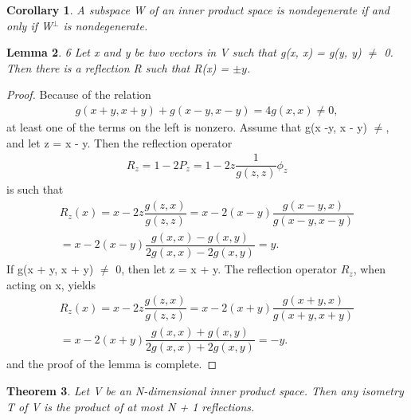 \documentclass[12pt,a4paper]{article}
\newtheorem{thm}{Theorem}
\newtheorem{lem}[thm]{Lemma}
\newtheorem{cor}[thm]{Corollary}
\begin{document}
\begin{cor}
A subspace W of an inner product space is nondegenerate if and only if W$^\perp$ is nondegenerate.
\end{cor}
\begin{lem}
6 Let x and y be two vectors in V such that g(x, x) =
g(y, y) $\ne$ 0. Then there is a reflection R such that R(x) = $\pm y$.
\end{lem}
\begin{proof}
Because of the relation
\begin{eqnarray*}
g(x + y, x + y) + g(x -y, x - y) = 4g(x, x) \ne 0,
\end{eqnarray*}
at least one of the terms on the left is nonzero. Assume that g(x -y, x - y) $\ne$, and let z = x - y. Then the reflection operator
\begin{eqnarray*}
R_z = 1 - 2P_z = 1 - 2z \dfrac{1}{g(z, z)} \phi_z
\end{eqnarray*}
is such that 
\begin{eqnarray*}
R_z(x) = x - 2z\dfrac{g(z,x)}{g(z,z)} = x - 2(x-y)\dfrac{g(x - y, x)}{g(x - y, x -y)}\\
=x - 2(x-y)\dfrac{g(x,x) - g(x, y)}{2g(x,x) - 2g(x,y)} = y.
\end{eqnarray*}
If g(x + y, x + y) $\neq$ 0, then let z = x + y. The reflection operator $R_z$, when acting on x, yields
\begin{eqnarray*}
R_z(x) = x - 2z\dfrac{g(z,x)}{g(z,z)} = x - 2(x + y)\dfrac{g(x+y,x)}{g(x+y, x+y)}\\
= x - 2(x+y)\dfrac{g(x,x) + g(x,y)}{2g(x,x) + 2g(x,y)} = -y.
\end{eqnarray*}
and the proof of the lemma is complete. 
\end{proof}
\begin{thm}
Let V be an N-dimensional inner product space.
Then any isometry T of V is the product of at most N + 1 reflections.
\end{thm}
\end{document}
